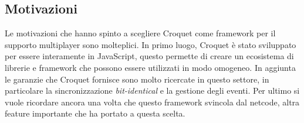 \subsection{Motivazioni}\label{subsec:Croquet_motivazioni}
Le motivazioni che hanno spinto a scegliere Croquet come framework per il supporto multiplayer sono molteplici. In primo luogo, Croquet è stato sviluppato per essere interamente
in JavaScript, questo permette di creare un ecosistema di librerie e framework che possono essere utilizzati in modo omogeneo. In aggiunta le garanzie che Croquet fornisce sono
molto ricercate in questo settore, in particolare la sincronizzazione \textit{bit-identical} e la gestione degli eventi. Per ultimo si vuole ricordare ancora una volta che
questo framework svincola dal netcode, altra feature importante che ha portato a questa scelta.\\ 